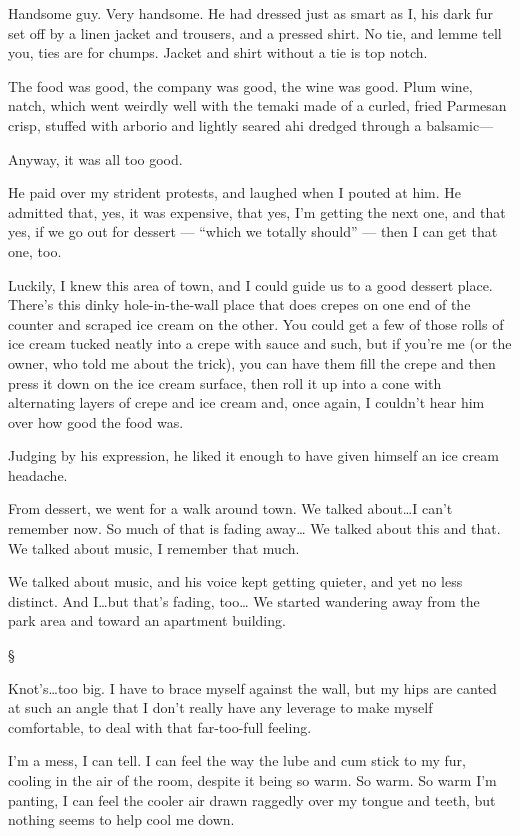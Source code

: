 \documentclass[12pt,letterpaper,oneside]{memoir}
\newcommand\secdiv{
  \begin{center}
    \S
  \end{center}
}
\begin{document}
  Handsome guy. Very handsome. He had dressed just as smart as I, his dark fur set off by a linen jacket and trousers, and a pressed shirt. No tie, and lemme tell you, ties are for chumps. Jacket and shirt without a tie is top notch.

  The food was good, the company was good, the wine was good. Plum wine, natch, which went weirdly well with the temaki made of a curled, fried Parmesan crisp, stuffed with arborio and lightly seared ahi dredged through a balsamic---

  Anyway, it was all too good.

  He paid over my strident protests, and laughed when I pouted at him. He admitted that, yes, it was expensive, that yes, I'm getting the next one, and that yes, if we go out for dessert --- ``which we totally should'' --- then I can get that one, too.

  Luckily, I knew this area of town, and I could guide us to a good dessert place. There's this dinky hole-in-the-wall place that does crepes on one end of the counter and scraped ice cream on the other. You could get a few of those rolls of ice cream tucked neatly into a crepe with sauce and such, but if you're me (or the owner, who told me about the trick), you can have them fill the crepe and then press it down on the ice cream surface, then roll it up into a cone with alternating layers of crepe and ice cream and, once again, I couldn't hear him over how good the food was.

  Judging by his expression, he liked it enough to have given himself an ice cream headache.

  From dessert, we went for a walk around town. We talked about\ldots{}I can't remember now. So much of that is fading away\ldots{} We talked about this and that. We talked about music, I remember that much.

  We talked about music, and his voice kept getting quieter, and yet no less distinct. And I\ldots{}but that's fading, too\ldots{} We started wandering away from the park area and toward an apartment building.

  \secdiv

  Knot's\ldots{}too big. I have to brace myself against the wall, but my hips are canted at such an angle that I don't really have any leverage to make myself comfortable, to deal with that far-too-full feeling.

  I'm a mess, I can tell. I can feel the way the lube and cum stick to my fur, cooling in the air of the room, despite it being so warm. So warm. So warm I'm panting, I can feel the cooler air drawn raggedly over my tongue and teeth, but nothing seems to help cool me down.
\end{document}
